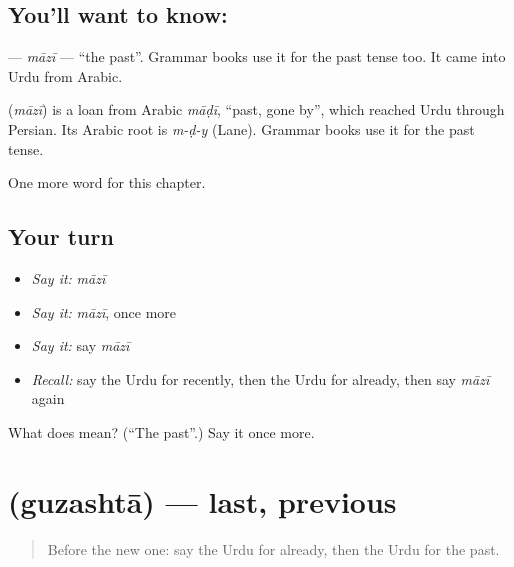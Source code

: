 \subsection*{You'll want to know: }
\textbf{} — \emph{māzī} — \textquotedblleft{}the past\textquotedblright{}. Grammar books use it for the past tense too. It came into Urdu from Arabic.

\begin{cousinweb}
\textbf{} (\emph{māzī}) is a loan from Arabic \emph{māḍī}, \textquotedblleft{}past, gone by\textquotedblright{}, which reached Urdu through Persian. Its Arabic root is \emph{m-ḍ-y} (Lane). Grammar books use it for the past tense.
\end{cousinweb}

\begin{grammarlens}[title={What you've built}]
One more word for this chapter.
\end{grammarlens}

\subsection*{Your turn}
\begin{itemize}
\raggedright
  \item \emph{Say it:} \emph{māzī}
  \item \emph{Say it:} \emph{māzī}, once more
  \item \emph{Say it:} say \emph{māzī}
  \item \emph{Recall:} say the Urdu for recently, then the Urdu for already, then say \emph{māzī} again
\end{itemize}

\begin{tcolorbox}[breakable,colback=teal!4,colframe=teal!35!black,title={Before you move on}]
What does  mean? (\textquotedblleft{}The past\textquotedblright{}.) Say it once more.
\end{tcolorbox}
\section[\texorpdfstring{\ur{گزشتہ} (guzashtā)}{گزشتہ (guzashtā)}]{ (guzashtā) — last, previous}

\label{lesson:UR-C144-guzashta}



\begin{quote}
Before the new one: say the Urdu for already, then the Urdu for the past.
\end{quote}

